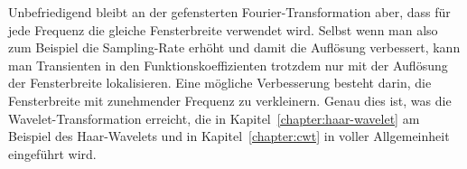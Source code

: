 Unbefriedigend bleibt an der gefensterten Fourier-Transformation aber,
dass für jede Frequenz die gleiche Fensterbreite verwendet wird.
Selbst wenn man also zum Beispiel die Sampling-Rate erhöht und damit
die Auflösung verbessert, kann man Transienten in den
Funktionskoeffizienten trotzdem nur mit der Auflösung der Fensterbreite
lokalisieren.
Eine mögliche Verbesserung besteht darin, die Fensterbreite mit zunehmender
Frequenz zu verkleinern.
Genau dies ist, was die Wavelet-Transformation erreicht, die in
Kapitel~\ref{chapter:haar-wavelet} am Beispiel des Haar-Wavelets und in
Kapitel~\ref{chapter:cwt} in voller Allgemeinheit eingeführt wird.

